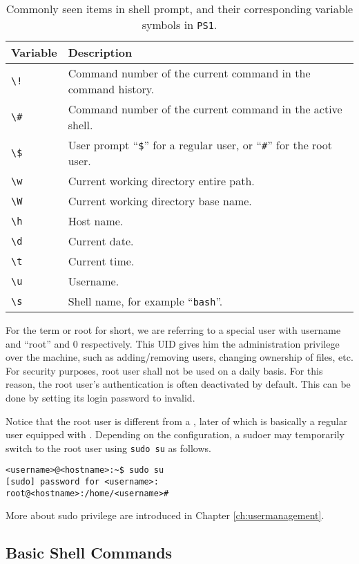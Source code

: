 \begin{table}
	\centering \caption{Commonly seen items in shell prompt, and their corresponding variable symbols in \texttt{PS1}.}\label{ch:sb:tab:promptvariable}
	\begin{tabularx}{\textwidth}{lX}
		\hline
		Variable & Description \\ \hline
		\verb|\!| & Command number of the current command in the command history. \\ 
		\verb|\#| & Command number of the current command in the active shell. \\ 
		\verb|\$| & User prompt ``\verb|$|'' for a regular user, or ``\verb|#|'' for the root user. \\
		\verb|\w| & Current working directory entire path. \\ 
		\verb|\W| & Current working directory base name. \\ 
		\verb|\h| & Host name. \\ 
		\verb|\d| & Current date. \\ 
		\verb|\t| & Current time. \\ 
		\verb|\u| & Username. \\ 
		\verb|\s| & Shell name, for example ``\verb|bash|''. \\ 
		\hline
	\end{tabularx}
\end{table}

For the term  or root for short, we are referring to a special user with username and  ``root'' and 0 respectively. This UID gives him the administration privilege over the machine, such as adding/removing users, changing ownership of files, etc. For security purposes, root user shall not be used on a daily basis. For this reason, the root user's authentication is often deactivated by default. This can be done by setting its login password to invalid.

Notice that the root user is different from a , later of which is basically a regular user equipped with . Depending on the configuration, a sudoer may temporarily switch to the root user using \verb|sudo su| as follows.
\begin{lstlisting}
<username>@<hostname>:~$ sudo su
[sudo] password for <username>:
root@<hostname>:/home/<username>#
\end{lstlisting}
More about sudo privilege are introduced in Chapter \ref{ch:usermanagement}.

\subsection{Basic Shell Commands}

